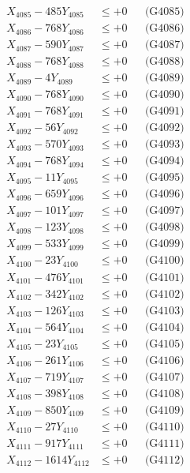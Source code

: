 \documentclass[a4paper,10pt]{article}
\begin{document}
{\begin{align}
X_{4085} - 485Y_{4085} &\leq +0 && \text{(G4085)} \\
X_{4086} - 768Y_{4086} &\leq +0 && \text{(G4086)} \\
X_{4087} - 590Y_{4087} &\leq +0 && \text{(G4087)} \\
X_{4088} - 768Y_{4088} &\leq +0 && \text{(G4088)} \\
X_{4089} - 4Y_{4089} &\leq +0 && \text{(G4089)} \\
X_{4090} - 768Y_{4090} &\leq +0 && \text{(G4090)} \\
\allowbreak
X_{4091} - 768Y_{4091} &\leq +0 && \text{(G4091)} \\
X_{4092} - 56Y_{4092} &\leq +0 && \text{(G4092)} \\
X_{4093} - 570Y_{4093} &\leq +0 && \text{(G4093)} \\
X_{4094} - 768Y_{4094} &\leq +0 && \text{(G4094)} \\
X_{4095} - 11Y_{4095} &\leq +0 && \text{(G4095)} \\
X_{4096} - 659Y_{4096} &\leq +0 && \text{(G4096)} \\
X_{4097} - 101Y_{4097} &\leq +0 && \text{(G4097)} \\
X_{4098} - 123Y_{4098} &\leq +0 && \text{(G4098)} \\
X_{4099} - 533Y_{4099} &\leq +0 && \text{(G4099)} \\
X_{4100} - 23Y_{4100} &\leq +0 && \text{(G4100)} \\
\allowbreak
X_{4101} - 476Y_{4101} &\leq +0 && \text{(G4101)} \\
X_{4102} - 342Y_{4102} &\leq +0 && \text{(G4102)} \\
X_{4103} - 126Y_{4103} &\leq +0 && \text{(G4103)} \\
X_{4104} - 564Y_{4104} &\leq +0 && \text{(G4104)} \\
X_{4105} - 23Y_{4105} &\leq +0 && \text{(G4105)} \\
X_{4106} - 261Y_{4106} &\leq +0 && \text{(G4106)} \\
X_{4107} - 719Y_{4107} &\leq +0 && \text{(G4107)} \\
X_{4108} - 398Y_{4108} &\leq +0 && \text{(G4108)} \\
X_{4109} - 850Y_{4109} &\leq +0 && \text{(G4109)} \\
X_{4110} - 27Y_{4110} &\leq +0 && \text{(G4110)} \\
\allowbreak
X_{4111} - 917Y_{4111} &\leq +0 && \text{(G4111)} \\
X_{4112} - 1614Y_{4112} &\leq +0 && \text{(G4112)} \\

\end{align}}
\end{document}
